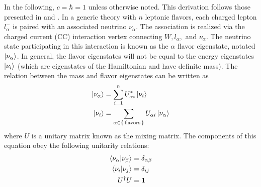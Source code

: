 In the following, $c = \hbar = 1$ unless otherwise noted.
This derivation follows those presented in \cite{neutrino_textbook}
and \cite{huang_thesis}.
In a generic theory with $n$ leptonic flavors,
each charged lepton $l_\alpha^-$ is paired with
an associated neutrino $\nu_\alpha$.
The association is realized via the charged current (CC) interaction vertex
connecting $W, l_\alpha,$ and $\nu_\alpha$.
The neutrino state participating in this interaction
is known as the $\alpha$ flavor eigenstate, notated $\ket{\nu_\alpha}$.
In general, the flavor eigenstates will not be equal to the energy eigenstates
$\ket{\nu_i}$
(which are eigenstates of the Hamiltonian and have definite mass).
The relation between the mass and flavor eigenstates can be written as
\begin{align}\label{eq:general_eigenstates}
    \begin{split}
        \ket{\nu_\alpha} &= \sum_{i=1}^n U^*_{\alpha i} \ket{\nu_i} \\
        \ket{\nu_i} &= \sum_{\alpha\in\set{\text{flavors}}} U_{\alpha i} \ket{\nu_\alpha}
    \end{split}
\end{align}
where $U$ is a unitary matrix known as the mixing matrix.
The components of this equation obey the following unitarity relations:
\begin{align}\label{eq:unitarity}
    \begin{split}
        \braket{\nu_\alpha | \nu_\beta} &= \delta_{\alpha\beta} \\
        \braket{\nu_i | \nu_j} &= \delta_{ij} \\
        U^\dagger U &= \mathbf{1}
    \end{split}
\end{align}

